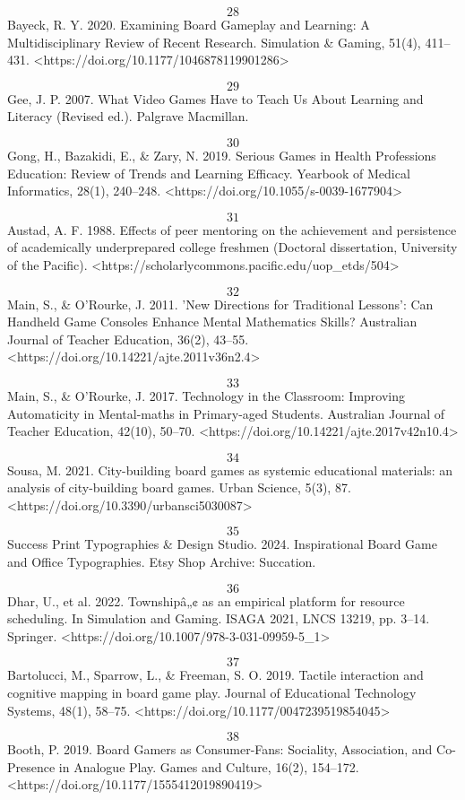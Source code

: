 \textbf{\[28\]} Bayeck, R. Y. 2020. Examining Board Gameplay and Learning: A Multidisciplinary Review of Recent Research. Simulation \& Gaming, 51(4), 411--431. <https://doi.org/10.1177/1046878119901286>

\textbf{\[29\]} Gee, J. P. 2007. What Video Games Have to Teach Us About Learning and Literacy (Revised ed.). Palgrave Macmillan.

\textbf{\[30\]} Gong, H., Bazakidi, E., \& Zary, N. 2019. Serious Games in Health Professions Education: Review of Trends and Learning Efficacy. Yearbook of Medical Informatics, 28(1), 240--248. <https://doi.org/10.1055/s-0039-1677904>

\textbf{\[31\]} Austad, A. F. 1988. Effects of peer mentoring on the achievement and persistence of academically underprepared college freshmen (Doctoral dissertation, University of the Pacific). <https://scholarlycommons.pacific.edu/uop_etds/504>

\textbf{\[32\]} Main, S., \& O'Rourke, J. 2011. 'New Directions for Traditional Lessons': Can Handheld Game Consoles Enhance Mental Mathematics Skills? Australian Journal of Teacher Education, 36(2), 43--55. <https://doi.org/10.14221/ajte.2011v36n2.4>

\textbf{\[33\]} Main, S., \& O'Rourke, J. 2017. Technology in the Classroom: Improving Automaticity in Mental-maths in Primary-aged Students. Australian Journal of Teacher Education, 42(10), 50--70. <https://doi.org/10.14221/ajte.2017v42n10.4>

\textbf{\[34\]} Sousa, M. 2021. City-building board games as systemic educational materials: an analysis of city-building board games. Urban Science, 5(3), 87. <https://doi.org/10.3390/urbansci5030087>

\textbf{\[35\]} Success Print Typographies \& Design Studio. 2024. Inspirational Board Game and Office Typographies. Etsy Shop Archive: Succation.

\textbf{\[36\]} Dhar, U., et al. 2022. Townshipâ„¢ as an empirical platform for resource scheduling. In Simulation and Gaming. ISAGA 2021, LNCS 13219, pp. 3--14. Springer. <https://doi.org/10.1007/978-3-031-09959-5_1>

\textbf{\[37\]} Bartolucci, M., Sparrow, L., \& Freeman, S. O. 2019. Tactile interaction and cognitive mapping in board game play. Journal of Educational Technology Systems, 48(1), 58--75. <https://doi.org/10.1177/0047239519854045>

\textbf{\[38\]} Booth, P. 2019. Board Gamers as Consumer-Fans: Sociality, Association, and Co-Presence in Analogue Play. Games and Culture, 16(2), 154--172. <https://doi.org/10.1177/1555412019890419>


